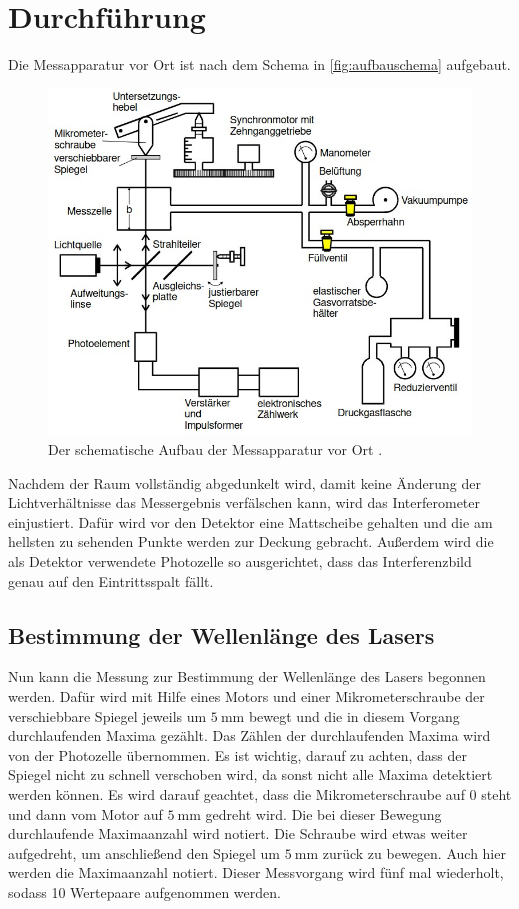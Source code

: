 \section{Durchführung}
\label{sec:Durchführung}
Die Messapparatur vor Ort ist nach dem Schema in \autoref{fig:aufbauschema} aufgebaut.
\begin{figure}
    \centering
    \includegraphics[width=\textwidth]{content/aufbauversuch.jpg}
    \caption{Der schematische Aufbau der Messapparatur vor Ort \cite{anleitung}.}
    \label{fig:aufbauschema}
\end{figure}

\noindent
Nachdem der Raum vollständig abgedunkelt wird, damit keine Änderung der Lichtverhältnisse das Messergebnis verfälschen kann, wird das Interferometer einjustiert.
Dafür wird vor den Detektor eine Mattscheibe gehalten und die am hellsten zu sehenden Punkte werden zur Deckung gebracht. Außerdem wird die als Detektor verwendete
Photozelle so ausgerichtet, dass das Interferenzbild genau auf den Eintrittsspalt fällt.


\subsection{Bestimmung der Wellenlänge des Lasers}
Nun kann die Messung zur Bestimmung der Wellenlänge des Lasers begonnen werden. Dafür wird mit Hilfe eines Motors und einer Mikrometerschraube der verschiebbare 
Spiegel jeweils um $\SI{5}{\milli\meter}$ bewegt und die in diesem Vorgang durchlaufenden Maxima gezählt. Das Zählen der durchlaufenden Maxima wird von der 
Photozelle übernommen. Es ist wichtig, darauf zu achten, dass der Spiegel nicht zu schnell verschoben wird, da sonst nicht alle Maxima detektiert werden können.
Es wird darauf geachtet, dass die Mikrometerschraube auf 0 steht und dann vom Motor auf $\SI{5}{\milli\metre}$ gedreht wird. Die bei dieser Bewegung durchlaufende
Maximaanzahl wird notiert. Die Schraube wird etwas weiter aufgedreht, um anschließend den Spiegel um $\SI{5}{\milli\meter}$ zurück zu bewegen. Auch hier werden die Maximaanzahl notiert.
Dieser Messvorgang wird fünf mal wiederholt, sodass 10 Wertepaare aufgenommen werden.

